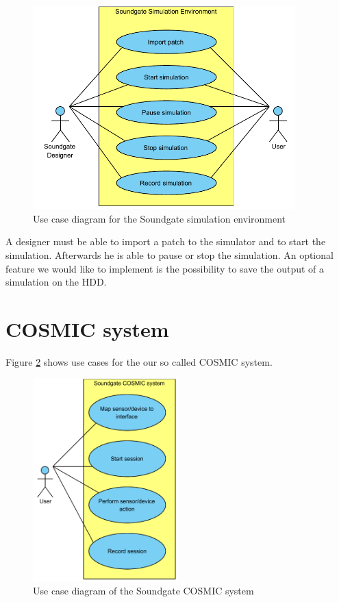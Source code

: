 	\begin{figure}[!h]
		\centering
			\includegraphics[width=0.90\textwidth]{images/Soundgate_Simulator.pdf}
		\caption{Use case diagram for the Soundgate simulation environment}
		\label{fig:Soundgate_Simulator}
	\end{figure}

A designer must be able to import a patch to the simulator and to start the simulation. Afterwards he is able to pause or stop the simulation. An optional feature we would like to implement is the possibility to save the output of a simulation on the HDD.

\section{COSMIC system}

Figure \ref{fig:Soundgate_UserInterface} shows use cases for the our so called \ac{COSMIC} system. 

	\begin{figure}[!h]
		\centering
			\includegraphics[width=0.50\textwidth]{images/User_View.pdf}
		\caption{Use case diagram of the Soundgate COSMIC system}
		\label{fig:Soundgate_UserInterface}
	\end{figure}
	
